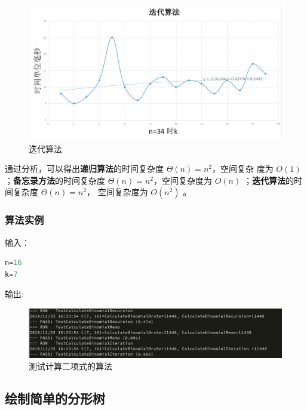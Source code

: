 \documentclass{ctexart}
\begin{document}
\begin{figure}[H]
	\centering
	\includegraphics[scale=0.4]{../images/iteration.png}
	\caption{迭代算法}
\end{figure}

通过分析，可以得出{\bfseries 递归算法}的时间复杂度 $\Theta(n) = n^2$，空间复杂
度为 $O(1)$ ；{\bfseries 备忘录方法}的时间复杂度 $\Theta(n) = n^2，
$空间复杂度为 $O(n)$ ；{\bfseries 迭代算法}的时间复杂度 $\Theta(n) = n^2$，
空间复杂度为 $O(n^2)$ 。
\subsubsection{算法实例}
输入：
\begin{lstlisting}[language=C]
n=16
k=7
\end{lstlisting}

输出:

\begin{figure}[H]
	\centering
	\includegraphics[scale=0.5]{../images/binomial-test.png}
	\caption{测试计算二项式的算法}
\end{figure}

\newpage
\subsection{绘制简单的分形树}
\end{document}
